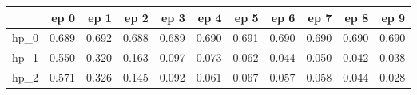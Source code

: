 \begin{tabular}{lrrrrrrrrrr}
\toprule
{} &   ep 0 &   ep 1 &   ep 2 &   ep 3 &   ep 4 &   ep 5 &   ep 6 &   ep 7 &   ep 8 &   ep 9 \\
\midrule
hp\_0 &  0.689 &  0.692 &  0.688 &  0.689 &  0.690 &  0.691 &  0.690 &  0.690 &  0.690 &  0.690 \\
hp\_1 &  0.550 &  0.320 &  0.163 &  0.097 &  0.073 &  0.062 &  0.044 &  0.050 &  0.042 &  0.038 \\
hp\_2 &  0.571 &  0.326 &  0.145 &  0.092 &  0.061 &  0.067 &  0.057 &  0.058 &  0.044 &  0.028 \\
\bottomrule
\end{tabular}
